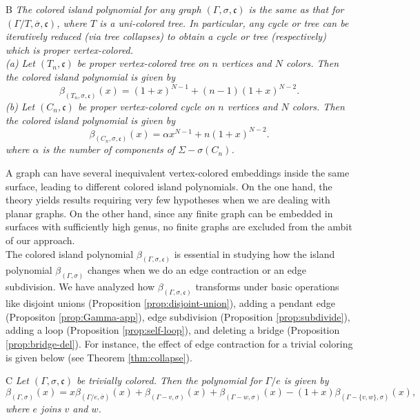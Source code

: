 \documentclass[10pt, reqno]{amsart}
\newcommand{\hf}{\hspace*{0.5cm}}
\theoremstyle{plain}
\theoremstyle{remark}
\theoremstyle{definition}
\numberwithin{equation}{section}
\begin{document}
\begin{customthm}{B}
{\it The colored island polynomial for any graph $(\Gamma,\sigma,\mathfrak{c})$ is the same as that for $(\Gamma/T,\overline{\sigma},\mathfrak{c})$, where $T$ is a uni-colored tree. In particular, any cycle or tree can be iteratively reduced (via tree collapses) to obtain a cycle or tree (respectively) which is proper vertex-colored. \\
\textup{(a)} Let $(T_n,\mathfrak{c})$ be proper vertex-colored tree on $n$ vertices and $N$ colors. Then the colored island polynomial is given by
\begin{equation*}
{\beta}_{(T_{n},\sigma,\mathfrak{c})}(x)= (1+x)^{N-1}+(n-1)(1+x)^{N-2}.
\end{equation*}
\textup{(b)} Let $(C_n,\mathfrak{c})$ be proper vertex-colored cycle on $n$ vertices and $N$ colors. Then the colored island polynomial is given by
\begin{equation*}
{\beta}_{(C_{n},\sigma,\mathfrak{c})}(x)=\alpha x^{N-1}+n(1+x)^{N-2}.
\end{equation*}
where $\alpha$ is the number of components of $\Sigma-\sigma(C_n)$.}
\end{customthm}
A graph can have several inequivalent vertex-colored embeddings inside the same surface, leading to different colored island polynomials. On the one hand, the theory yields results requiring very few hypotheses when we are dealing with planar graphs. On the other hand, since any finite graph can be embedded in surfaces with sufficiently high genus, no finite graphs are excluded from the ambit of our approach. \\
\hf The colored island polynomial $\beta_{(\Gamma,\sigma,\mathfrak{c})}$ is essential in studying how the island polynomial $\beta_{(\Gamma,\sigma)}$ changes when we do an edge contraction or an edge subdivision. We have analyzed how $\beta_{(\Gamma,\sigma,\mathfrak{c})}$ transforms under basic operations like disjoint unions (Proposition \ref{prop:disjoint-union}), adding a pendant edge (Propositon \ref{prop:Gamma-app}), edge subdivision (Proposition \ref{prop:subdivide}), adding a loop (Proposition \ref{prop:self-loop}), and deleting a bridge (Proposition \ref{prop:bridge-del}). For instance, the effect of edge contraction for a trivial coloring is given below (see Theorem \ref{thm:collapse}).
\begin{customthm}{C}
{\it Let $(\Gamma,\sigma,\mathfrak{c})$ be trivially colored. Then the polynomial for $\Gamma/e$ is given by
\begin{equation*}
{\beta}_{(\Gamma,\sigma)}(x)=x{\beta}_{(\Gamma/e,\overline{\sigma})}(x)+{\beta}_{(\Gamma-v,\sigma)}(x)+{\beta}_{(\Gamma-w,\sigma)}(x)-(1+x){\beta}_{(\Gamma-\{v,w\},\sigma)}(x),
\end{equation*}
where $e$ joins $v$ and $w$.}
\end{customthm}
\end{document}
